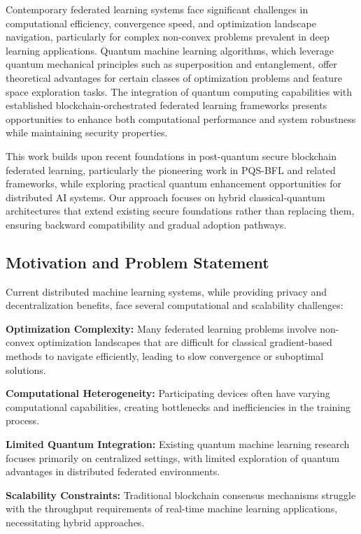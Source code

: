\documentclass[10pt,journal,compsoc]{IEEEtran}
\begin{document}
Contemporary federated learning systems face significant challenges in computational efficiency, convergence speed, and optimization landscape navigation, particularly for complex non-convex problems prevalent in deep learning applications. Quantum machine learning algorithms, which leverage quantum mechanical principles such as superposition and entanglement, offer theoretical advantages for certain classes of optimization problems and feature space exploration tasks. The integration of quantum computing capabilities with established blockchain-orchestrated federated learning frameworks presents opportunities to enhance both computational performance and system robustness while maintaining security properties.

This work builds upon recent foundations in post-quantum secure blockchain federated learning, particularly the pioneering work in PQS-BFL and related frameworks, while exploring practical quantum enhancement opportunities for distributed AI systems. Our approach focuses on hybrid classical-quantum architectures that extend existing secure foundations rather than replacing them, ensuring backward compatibility and gradual adoption pathways.

\subsection{Motivation and Problem Statement}

Current distributed machine learning systems, while providing privacy and decentralization benefits, face several computational and scalability challenges:

\textbf{Optimization Complexity:} Many federated learning problems involve non-convex optimization landscapes that are difficult for classical gradient-based methods to navigate efficiently, leading to slow convergence or suboptimal solutions.

\textbf{Computational Heterogeneity:} Participating devices often have varying computational capabilities, creating bottlenecks and inefficiencies in the training process.

\textbf{Limited Quantum Integration:} Existing quantum machine learning research focuses primarily on centralized settings, with limited exploration of quantum advantages in distributed federated environments.

\textbf{Scalability Constraints:} Traditional blockchain consensus mechanisms struggle with the throughput requirements of real-time machine learning applications, necessitating hybrid approaches.
\end{document}
